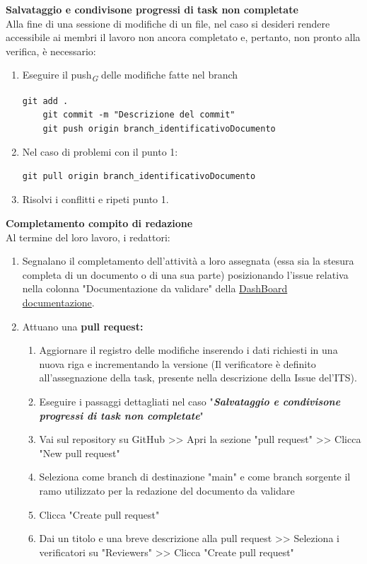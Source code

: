 \documentclass{article}
\begin{document}
     \textbf{Salvataggio e condivisone progressi di task non completate}\\
    Alla fine di una sessione di modifiche di un file, nel caso si desideri rendere accessibile ai membri il lavoro non ancora completato e, pertanto, non pronto alla verifica, è necessario:
    \begin{enumerate}
        \item Eseguire il push\textsubscript{\textit{G}}  delle modifiche fatte nel branch 
        \begin{lstlisting}[style=code]
    git add .
    git commit -m "Descrizione del commit"
    git push origin branch_identificativoDocumento
        \end{lstlisting}

        \item Nel caso di problemi con il punto 1:
        \begin{lstlisting}[style=code]
   git pull origin branch_identificativoDocumento
        \end{lstlisting}
        \item Risolvi i conflitti e ripeti punto 1.
    \end{enumerate}
\vspace{0.3cm}
     \textbf{Completamento compito di redazione}\\
    Al termine del loro lavoro, i redattori:
    \begin{enumerate}
        \item Segnalano il completamento dell'attività a loro assegnata (essa sia la stesura completa di un documento o di una sua parte) posizionando l'issue relativa nella colonna "Documentazione da validare" della  \href{https://github.com/orgs/ByteOps-swe/projects/1/views/1}{DashBoard documentazione}.
        \item Attuano una \textbf{pull request:}
        \begin{enumerate}
     \item Aggiornare il registro delle modifiche inserendo i dati richiesti in  una nuova riga e incrementando la versione (Il verificatore è definito all'assegnazione della task, presente nella descrizione della Issue del'ITS).
        \item Eseguire i passaggi dettagliati nel caso "\textit{\textbf{Salvataggio e condivisone progressi di task non completate}}"
        \item Vai sul repository su GitHub >> Apri la sezione "pull request" >> Clicca "New pull request"
        \item Seleziona come branch di destinazione "main" e come branch sorgente il ramo utilizzato per la redazione del documento da validare
        \item Clicca "Create pull request"
        \item Dai un titolo e una breve descrizione alla pull request >> Seleziona i verificatori su "Reviewers" >> Clicca "Create pull request"
    \end{enumerate}
    \end{enumerate}
    
\end{document}

